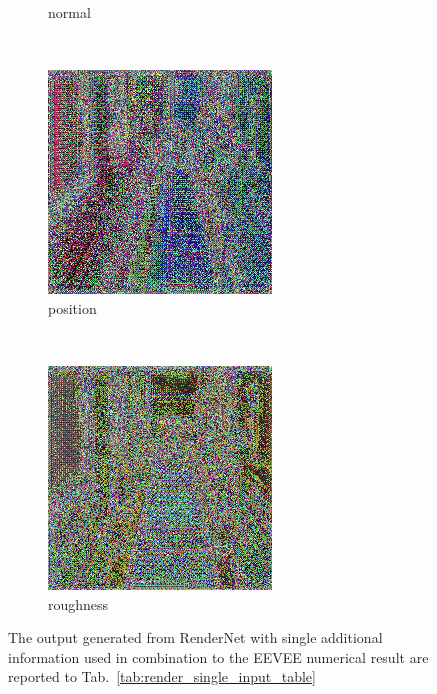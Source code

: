 \begin{figure}[h!]
\begin{subfigure}[b]{0.175\textwidth}
     \caption{normal}
    \end{subfigure}
    ~
    \begin{subfigure}[b]{0.175\textwidth}
     \includegraphics[width=\textwidth]{figures/result/single/position/2.png}
     \caption{position}
    \end{subfigure}
    ~
    \begin{subfigure}[b]{0.175\textwidth}
     \includegraphics[width=\textwidth]{figures/result/single/roughness/2.png}
     \caption{roughness}
    \end{subfigure}
    \caption{The output generated from RenderNet with single additional information used in combination to the EEVEE numerical result are reported to Tab.~\ref{tab:render_single_input_table}}
    \label{fig:single_input_generation}
\end{figure}
